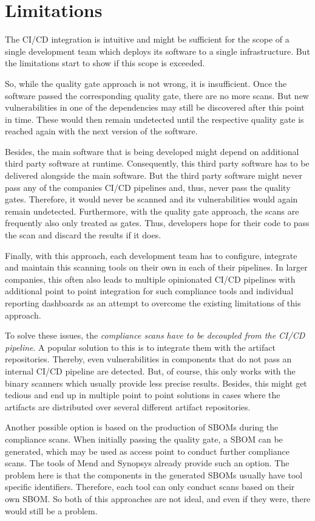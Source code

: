 \section{Limitations} \label{sec:Limitations}
The CI/CD integration is intuitive and might be sufficient for the scope of a single development team which deploys its software to a single infrastructure. But the limitations start to show if this scope is exceeded.\par
So, while the quality gate approach is not wrong, it is insufficient. Once the software passed the corresponding quality gate, there are no more scans. But new vulnerabilities in one of the dependencies may still be discovered after this point in time. These would then remain undetected until the respective quality gate is reached again with the next version of the software.\par
Besides, the main software that is being developed might depend on additional third party software at runtime. Consequently, this third party software has to be delivered alongside the main software. But the third party software might never pass any of the companies CI/CD pipelines and, thus, never pass the quality gates. Therefore, it would never be scanned and its vulnerabilities would again remain undetected. Furthermore, with the quality gate approach, the scans are frequently also only treated as gates. Thus, developers hope for their code to pass the scan and discard the results if it does.\par 
Finally, with this approach, each development team has to configure, integrate and maintain this scanning tools on their own in each of their pipelines. In larger companies, this often also leads to multiple opinionated CI/CD pipelines with additional point to point integration for such compliance tools and individual reporting dashboards as an attempt to overcome the existing limitations of this approach.\par
To solve these issues, the \textit{compliance scans have to be decoupled from the CI/CD pipeline}. A popular solution to this is to integrate them with the artifact repositories. Thereby, even vulnerabilities in components that do not pass an internal CI/CD pipeline are detected. But, of course, this only works with the binary scanners which usually provide less precise results. Besides, this might get tedious and end up in multiple point to point solutions in cases where the artifacts are distributed over several different artifact repositories.\par 
Another possible option is based on the production of SBOMs during the compliance scans. When initially passing the quality gate, a SBOM can be generated, which may be used as access point to conduct further compliance scans. The tools of Mend and Synopsys already provide such an option. The problem here is that the components in the generated SBOMs usually have tool specific identifiers. Therefore, each tool can only conduct scans based on their own SBOM. So both of this approaches are not ideal, and even if they were, there would still be a problem.\par

